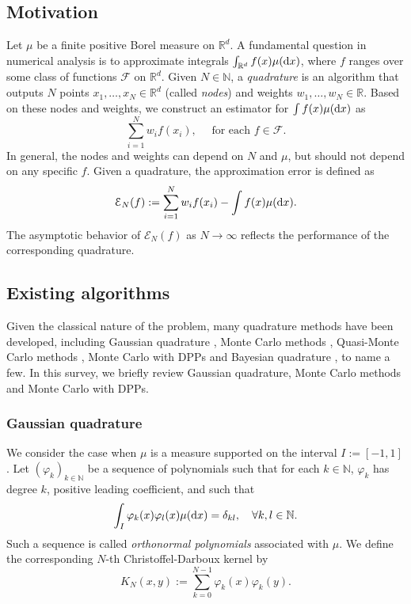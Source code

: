 \subsection{Motivation}
Let $\mu$ be a finite positive Borel measure on $\mathbb R^d$.
A fundamental question in numerical analysis is to approximate integrals $\int_{\mathbb R^d} f(x) \mu(\mathrm{d} x)$, where $f$ ranges over some class of functions $\mathcal F$ on $\mathbb R^d$. 
Given $N \in \mathbb N$, a \textit{quadrature} is an algorithm that outputs $N$ points $x_1,\ldots,x_N\in \mathbb R^d$ (called \textit{nodes}) and weights $w_1,\ldots,w_N \in \mathbb R$. Based on these nodes and weights, we construct an estimator for $\int f(x) \mu(\mathrm{d} x)$ as
\[ \sum_{i=1}^N w_i f(x_i), \quad \text{ for each } f\in \mathcal F.\]
In general, the nodes and weights can depend on $N$ and $\mu$, but should not depend on any specific $f$. Given a quadrature, the approximation error is defined as
\[\mathcal E_N(f) := \sum_{i=1}^N w_i f(x_i) - \int f(x) \mu(\mathrm{d} x).\]
The asymptotic behavior of $\mathcal E_N(f)$ as $N\rightarrow\infty$  reflects the performance of the corresponding quadrature.


\subsection{Existing algorithms}
Given the classical nature of the problem, many quadrature methods have been developed, including Gaussian quadrature \cite{DavisRabi,Gautschi,BrassPetras, GautschiVarga}, Monte Carlo methods \cite{MonteCarlobook, bardenet:MCMC}, Quasi-Monte Carlo methods \cite{Dick_Pillichshammer_2010, Dick_2013, Oates16}, Monte Carlo with DPPs \cite{bardenet:montecarlogaussian, OPE-AOAP, bardenet:montecarlodpp, lemoine2024montecarlomethodscompact} and Bayesian quadrature \cite{Huszar12, Briol2015}, to name a few. In this survey, we briefly review Gaussian quadrature, Monte Carlo methods and Monte Carlo with DPPs.

\subsubsection{Gaussian quadrature}
We consider the case when $\mu$ is a measure supported on the interval $I:=[-1,1]$. Let $(\varphi_k)_{k\in\mathbb N}$ be a sequence of polynomials such that for each $k\in \mathbb N$, $\varphi_k$ has degree $k$, positive leading coefficient, and such that
\[ \int_I \varphi_k(x)\varphi_l(x)\mu(\mathrm{d} x) =\delta_{kl}, \quad\forall k,l \in \mathbb N.\]
Such a sequence is called \emph{orthonormal polynomials} associated with $\mu$.
We define the corresponding $N$-th Christoffel-Darboux kernel by 
\[ K_N(x,y) := \sum_{k=0}^{N-1} \varphi_k(x)\varphi_k(y).\]

